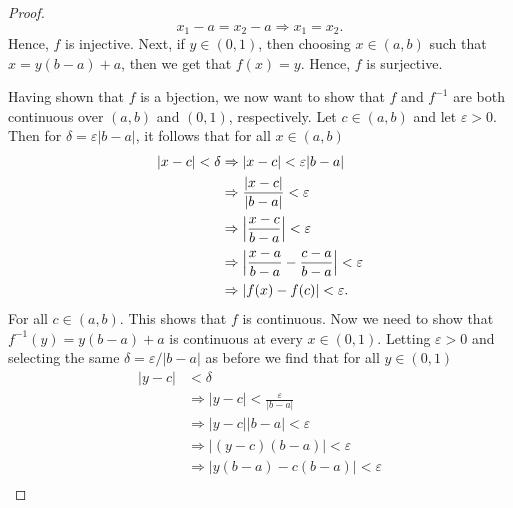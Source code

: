 \documentclass[12pt]{article}
\theoremstyle{definition}
\newcommand{\abs}[1]{\lvert #1 \rvert}
\newcommand{\bigabs}[1]{\Bigl \lvert #1 \Bigr \rvert}
\begin{document}
\begin{enumerate}
\begin{proof}
\begin{equation*}
                    x_1-a=x_2-a\Rightarrow x_1=x_2.
                \end{equation*}
                Hence, $f$ is injective. Next, if $y\in (0, 1)$, then choosing
                $x\in(a, b)$ such that $x=y(b-a)+a$, then we get that $f(x)=y$.
                Hence, $f$ is surjective.\par\hspace{4mm} Having shown that $f$
                is a bjection, we now want to show that $f$ and $f^{-1}$ are
                both continuous over $(a, b)$ and $(0, 1)$, respectively. Let
                $c\in (a, b)$ and let $\varepsilon>0$. Then for
                $\delta=\varepsilon\abs{b-a}$, it follows that for all $x\in(a, b)$
                \begin{equation*}
                    \begin{split}
                        \abs{x-c}<\delta&\Rightarrow
                        \abs{x-c}<\varepsilon\abs{b-a} \\
                        &\Rightarrow \frac{\abs{x-c}}{\abs{b-a}}<\varepsilon \\
                        &\Rightarrow\bigabs{\frac{x-c}{b-a}}<\varepsilon \\
                        &\Rightarrow\bigabs{\frac{x-a}{b-a}-\frac{c-a}{b-a}}<\varepsilon
                        \\
                        &\Rightarrow\abs{f(x)-f(c)}<\varepsilon.
                    \end{split}
                \end{equation*}
                For all $c\in (a, b)$. This shows that $f$ is continuous. Now we need to show
                that $f^{-1}(y)=y(b-a)+a$ is continuous at every $x\in (0,1)$. Letting
                $\varepsilon>0$ and selecting the same
                $\delta=\varepsilon/\abs{b-a}$ as before we find that for all
                $y\in(0, 1)$ 
                \begin{equation*}
                    \begin{split}
                        \abs{y-c} &<\delta \\
                        &\Rightarrow \abs{y-c} < \frac{\varepsilon}{\abs{b-a}}
                        \\
                        &\Rightarrow \abs{y-c}\abs{b-a} <\varepsilon \\
                        &\Rightarrow \abs{(y-c)(b-a)} <\varepsilon \\
                        &\Rightarrow \abs{y(b-a)-c(b-a)} <\varepsilon \\

\end{split}
\end{equation*}
\end{proof}
\end{enumerate}
\end{document}
